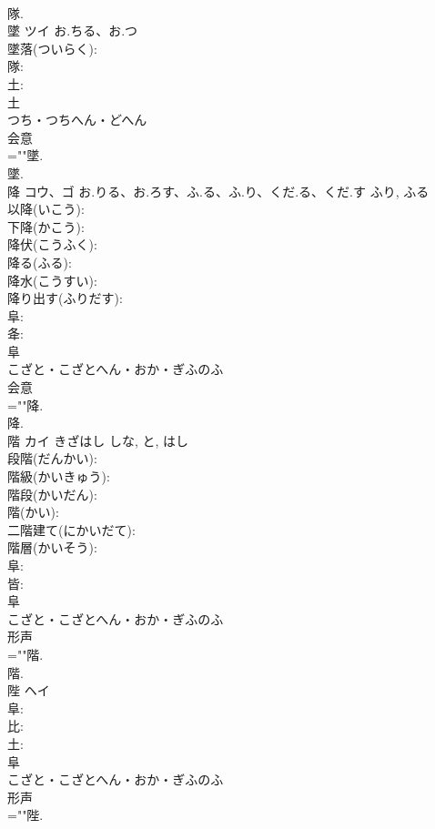 \documentclass[8pt]{extreport}
\begin{document}
\begin{CJK}{UTF8}{min}
\\	隊.
\\	墜	ツイ	お.ちる、お.つ		
\\	墜落(ついらく): 
\\	隊: 
\\	土: 
\\	土	
\\	つち・つちへん・どへん	
\\	会意 
\\	=""墜.
\\	墜.
\\	降	コウ、ゴ	お.りる、お.ろす、ふ.る、ふ.り、くだ.る、くだ.す	ふり, ふる	
\\	以降(いこう): 
\\	下降(かこう): 
\\	降伏(こうふく): 
\\	降る(ふる): 
\\	降水(こうすい): 
\\	降り出す(ふりだす): 
\\	阜: 
\\	夅: 
\\	阜	
\\	こざと・こざとへん・おか・ぎふのふ	
\\	会意 
\\	=""降.
\\	降.
\\	階	カイ	きざはし	しな, と, はし	
\\	段階(だんかい): 
\\	階級(かいきゅう): 
\\	階段(かいだん): 
\\	階(かい): 
\\	二階建て(にかいだて): 
\\	階層(かいそう): 
\\	阜: 
\\	皆: 
\\	阜	
\\	こざと・こざとへん・おか・ぎふのふ	
\\	形声 
\\	=""階.
\\	階.
\\	陛	ヘイ			
\\	阜: 
\\	比: 
\\	土: 
\\	阜	
\\	こざと・こざとへん・おか・ぎふのふ	
\\	形声 
\\	=""陛.

\end{CJK}
\end{document}
